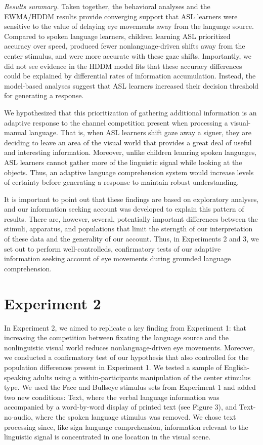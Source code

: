 \documentclass[english,floatsintext,man]{apa6}
\begin{document}
\emph{Results summary.} Taken together, the behavioral analyses and the
EWMA/HDDM results provide converging support that ASL learners were
sensitive to the value of delaying eye movements away from the language
source. Compared to spoken language learners, children learning ASL
prioritized accuracy over speed, produced fewer nonlanguage-driven
shifts away from the center stimulus, and were more accurate with these
gaze shifts. Importantly, we did not see evidence in the HDDM model fits
that these accuracy differences could be explained by differential rates
of information accumulation. Instead, the model-based analyses suggest
that ASL learners increased their decision threshold for generating a
response.

We hypothesized that this prioritization of gathering additional
information is an adaptive response to the channel competition present
when processing a visual-manual language. That is, when ASL learners
shift gaze away a signer, they are deciding to leave an area of the
visual world that provides a great deal of useful and interesting
information. Moreover, unlike children leanring spoken languages, ASL
learners cannot gather more of the linguistic signal while looking at
the objects. Thus, an adaptive language comprehension system would
increase levels of certainty before generating a response to maintain
robust understanding.

It is important to point out that these findings are based on
exploratory analyses, and our information seeking account was developed
to explain this pattern of results. There are, however, several,
potentially important differences between the stimuli, apparatus, and
populations that limit the sterngth of our interpretation of these data
and the generality of our account. Thus, in Experiments 2 and 3, we set
out to perform well-controlleds, confirmatory tests of our adaptive
information seeking account of eye movements during grounded language
comprehension.

\hypertarget{experiment-2}{%
\section{Experiment 2}\label{experiment-2}}

In Experiment 2, we aimed to replicate a key finding from Experiment 1:
that increasing the competition between fixating the language source and
the nonlinguistic visual world reduces nonlanguage-driven eye movements.
Moreover, we conducted a confirmatory test of our hypothesis that also
controlled for the population differences present in Experiment 1. We
tested a sample of English-speaking adults using a within-participants
manipulation of the center stimulus type. We used the Face and Bullseye
stimulus sets from Experiment 1 and added two new conditions: Text,
where the verbal language information was accompanied by a word-by-word
display of printed text (see Figure 3), and Text-no-audio, where the
spoken language stimulus was removed. We chose text processing since,
like sign language comprehension, information relevant to the linguistic
signal is concentrated in one location in the visual scene.
\end{document}
